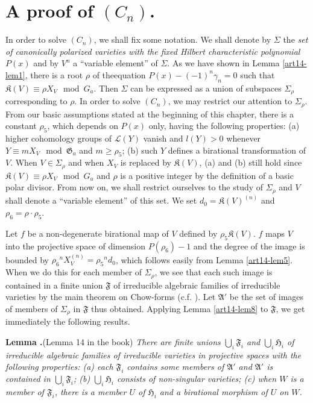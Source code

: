 \section{A proof of \texorpdfstring{$(C_{n})$}{Cn}.}\label{art14-sec9}

In order to solve $(C_{n})$, we shall fix some notation. We shall denote by $\Sigma$ the {\em set of canonically polarized varieties with the fixed Hilbert characteristic polynomial} $P(x)$ and by $V^{n}$ a ``variable element'' of $\Sigma$. As we have shown in Lemma \ref{art14-lem1}, there is a root $\rho$ of the\pageoriginale equation $P(x)-(-1)^{n}\gamma_{n}=0$ such that $\mathfrak{K}(V)\equiv \rho X_{V}\mod G_{a}$. Then $\Sigma$ can be expressed as a union of subspaces $\Sigma_{\rho}$ corresponding to $\rho$. In order to solve $(C_{n})$, we may restrict our attention to $\Sigma_{\rho}$. From our basic assumptions stated at the beginning of this chapter, there is a constant $\rho_{5}$, which depends on $P(x)$ only, having the following properties: (a) higher cohomology groups of $\mathscr{L}(Y)$ vanish and $l(Y)>0$ whenever $Y\equiv mX_{V}\mod \mathfrak{G}_{a}$ and $m\geq \rho_{5}$; (b) such $Y$ defines a birational transformation of $V$. When $V\in \Sigma_{\rho}$ and when $X_{V}$ is replaced by $\mathfrak{K}(V)$, (a) and (b) still hold since $\mathfrak{K}(V)\equiv\rho X_{V}\mod G_{a}$ and $\rho$ is a positive integer by the definition of a basic polar divisor. From now on, we shall restrict ourselves to the study of $\Sigma_{\rho}$ and $V$ shall denote a ``variable element'' of this set. We set $d_{0}=\mathfrak{K}(V)^{(n)}$ and $\rho_{6}=\rho\cdot \rho_{5}$.

Let $f$ be a non-degenerate birational map of $V$ defined by $\rho_{5}\mathfrak{K}(V)$. $f$ maps $V$ into the projective space of dimension $P(\rho_{6})-1$ and the degree of the image is bounded by $\rho_{6}{}^{n}X_{V}^{(n)}=\rho_{5}{}^{n}d_{0}$, which follows easily from Lemma \ref{art14-lem5}. When we do this for each member of $\Sigma_{\rho}$, we see that each such image is contained in a finite union $\mathfrak{F}$ of irreducible algebraic families of irreducible varieties by the main theorem on Chow-forms (c.f. \cite{art14-key3}). Let $\mathfrak{A}'$ be the set of images of members of $\Sigma_{\rho}$ in $\mathfrak{F}$ thus obtained. Applying Lemma \ref{art14-lem8} to $\mathfrak{F}$, we get immediately the following results.

\medskip
\noindent
{\bf Lemma .\label{art14-lem15}}(Lemma 14 in the book)
{\em There are finite unions $\bigcup_{i}\mathfrak{F}_{i}$ and $\bigcup_{i}\mathfrak{H}_{i}$ of irreducible algebraic families of irreducible varieties in projective spaces with the following properties: {\rm(a)} each $\mathfrak{F}_{i}$ contains some members of $\mathfrak{A}'$ and $\mathfrak{A}'$ is contained in $\bigcup_{i}\mathfrak{F}_{i}$; {\rm(b)} $\bigcup_{i}\mathfrak{H}_{i}$ consists of non-singular varieties; {\rm(c)} when $W$ is a member of $\mathfrak{F}_{i}$, there is a member $U$ of $\mathfrak{H}_{i}$ and a birational morphism of $U$ on $W$.}
\smallskip

